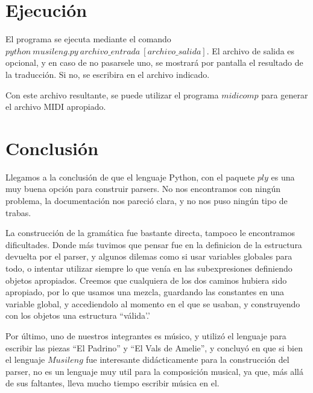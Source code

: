 \documentclass[a4paper, 10pt, twoside]{article}
\begin{document}

\section{Ejecución}
El programa se ejecuta mediante el comando $python\ musileng.py\ archivo\_entrada\ [archivo\_salida]$. El archivo de salida es opcional, y en caso de no pasarsele uno, se mostrará por pantalla el resultado de la traducción. Si no, se escribira en el archivo indicado.

Con este archivo resultante, se puede utilizar el programa $midicomp$ para generar el archivo MIDI apropiado.


\section{Conclusión}

Llegamos a la conclusión de que el lenguaje Python, con el paquete $ply$ es una muy buena opción para construir parsers. No nos encontramos con ningún problema, la documentación nos pareció clara, y no nos puso ningún tipo de trabas.

La construcción de la gramática fue bastante directa, tampoco le encontramos dificultades. Donde más tuvimos que pensar fue en la definicion de la estructura devuelta por el parser, y algunos dilemas como si usar variables globales para todo, o intentar utilizar siempre lo que venía en las subexpresiones definiendo objetos apropiados. Creemos que cualquiera de los dos caminos hubiera sido apropiado, por lo que usamos una mezcla, guardando las constantes en una variable global, y accediendolo al momento en el que se usaban, y construyendo con los objetos una estructura ``válida'.'

Por último, uno de nuestros integrantes es músico, y utilizó el lenguaje para escribir las piezas ``El Padrino'' y ``El Vals de Amelie'', y concluyó en que si bien el lenguaje $Musileng$ fue interesante didácticamente para la construcción del parser, no es un lenguaje muy util para la composición musical, ya que, más allá de sus faltantes, lleva mucho tiempo escribir música en el.
\end{document}
